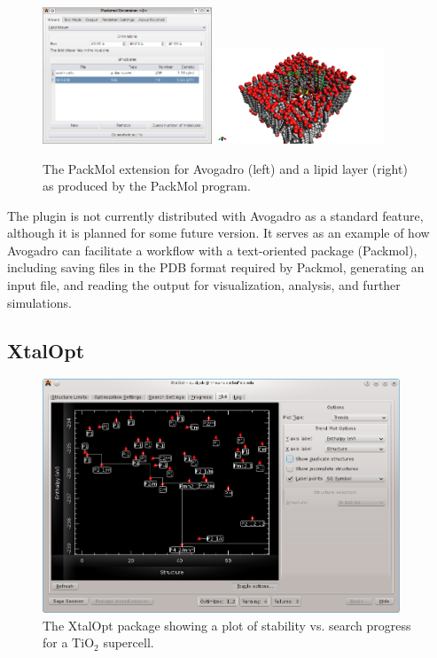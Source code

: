 \documentclass[10pt]{bmc_article}
\newenvironment{bmcformat}{\begin{raggedright}
\baselineskip20pt\sloppy\setboolean{publ}{false}}{\end{raggedright}
\baselineskip20pt\sloppy}
\begin{document}
\begin{bmcformat}
\begin{figure}
  \includegraphics[width=0.45\textwidth]{images/packmol-extension}
  \includegraphics[width=0.45\textwidth]{images/packmol-lipid}
  \caption{The PackMol extension for Avogadro (left) and a lipid layer (right)
    as produced by the PackMol program.}
  \label{f:packmol}
\end{figure}

The plugin is not currently distributed with Avogadro as a standard
feature, although it is planned for some future version. It serves as
an example of how Avogadro can facilitate a workflow with a
text-oriented package (Packmol), including saving files in the PDB
format required by Packmol, generating an input file, and reading the
output for visualization, analysis, and further simulations.

\subsection{XtalOpt}

\begin{figure}
  \includegraphics[width=0.95\textwidth]{images/xtalopt}
  \caption{The XtalOpt package showing a plot of stability vs. search progress
    for a $\mathrm{TiO_2}$ supercell.}
  \label{f:xtalopt}
\end{figure}


\end{bmcformat}
\end{document}
